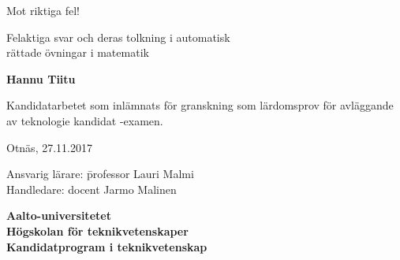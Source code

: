 {\parindent0pt %
\begin{spacing}{1.1}

 {\sffamily{}}
\end{spacing}

\vspace{12.7mm}

\begin{spacing}{1.63}
{\fontsize{17.8pt}{17.8pt}\selectfont Mot riktiga fel!}
\end{spacing}

\vspace{10.5mm}

\begin{spacing}{1.2}
{\fontsize{13pt}{13pt}\selectfont Felaktiga svar och deras tolkning i automatisk\\rättade övningar i matematik}
\end{spacing}

\vspace{10.6mm}

{\fontsize{13.9pt}{13.9pt}\bfseries\sffamily\lsstyle Hannu Tiitu}

\vfill

{\fontsize{10.3pt}{10.3pt}\sffamily\lsstyle\raggedright
\begin{spacing}{1.06}

Kandidatarbetet som inlämnats för granskning som lärdomsprov för
avläggande av teknologie kandidat -examen.

Otnäs, 27.11.2017

\begin{tabbing}
Ansvarig lärare:\hspace{6mm} \= professor Lauri Malmi \\
Handledare: \> docent Jarmo Malinen
\end{tabbing}
\vspace{-4mm}
\end{spacing}
} %

\vspace{11.5mm}

\begin{spacing}{.9}
{\bfseries\sffamily\lsstyle Aalto-universitetet \\
Högskolan för teknikvetenskaper \\
Kandidatprogram i teknikvetenskap}
\end{spacing}
} %



